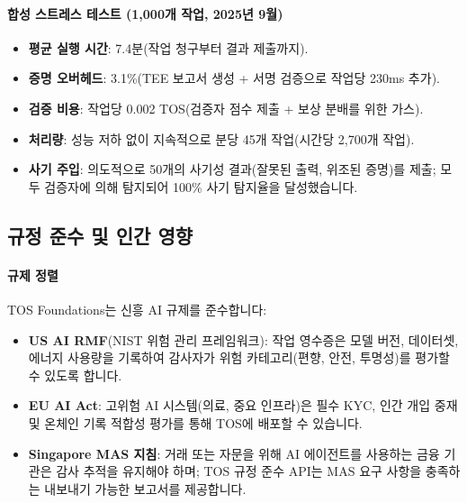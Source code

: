 \documentclass[11pt]{article}
\begin{document}
\paragraph{합성 스트레스 테스트 (1,000개 작업, 2025년 9월)}
\begin{itemize}[noitemsep]
  \item \textbf{평균 실행 시간}: 7.4분(작업 청구부터 결과 제출까지).
  \item \textbf{증명 오버헤드}: 3.1\%(TEE 보고서 생성 + 서명 검증으로 작업당 230ms 추가).
  \item \textbf{검증 비용}: 작업당 0.002 TOS(검증자 점수 제출 + 보상 분배를 위한 가스).
  \item \textbf{처리량}: 성능 저하 없이 지속적으로 분당 45개 작업(시간당 2,700개 작업).
  \item \textbf{사기 주입}: 의도적으로 50개의 사기성 결과(잘못된 출력, 위조된 증명)를 제출; 모두 검증자에 의해 탐지되어 100\% 사기 탐지율을 달성했습니다.
\end{itemize}

\subsection{규정 준수 및 인간 영향}
\paragraph{규제 정렬} TOS Foundations는 신흥 AI 규제를 준수합니다:
\begin{itemize}[noitemsep]
  \item \textbf{US AI RMF}(NIST 위험 관리 프레임워크): 작업 영수증은 모델 버전, 데이터셋, 에너지 사용량을 기록하여 감사자가 위험 카테고리(편향, 안전, 투명성)를 평가할 수 있도록 합니다.
  \item \textbf{EU AI Act}: 고위험 AI 시스템(의료, 중요 인프라)은 필수 KYC, 인간 개입 중재 및 온체인 기록 적합성 평가를 통해 TOS에 배포할 수 있습니다.
  \item \textbf{Singapore MAS 지침}: 거래 또는 자문을 위해 AI 에이전트를 사용하는 금융 기관은 감사 추적을 유지해야 하며; TOS 규정 준수 API는 MAS 요구 사항을 충족하는 내보내기 가능한 보고서를 제공합니다.
\end{itemize}
\end{document}
